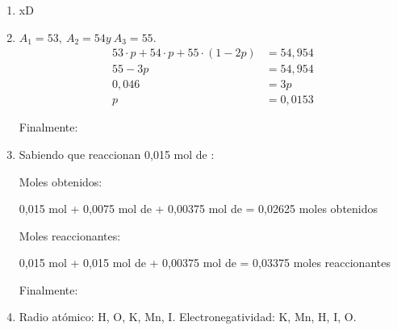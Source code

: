 \begin{enumerate}
\item xD


\item $A_1=53,\ A_2=54 y\ A_3=55.$
\begin{align*}
    53 \cdot p + 54 \cdot p + 55 \cdot (1 - 2p) &= 54,954\\    
    55 - 3p &= 54,954\\
    0,046 &= 3p\\
    p &= 0,0153
\end{align*}

Finalmente:

\hfil {}\hfil


\item Sabiendo que reaccionan 0,015 mol de :

Moles obtenidos:

\hfil
0,015 mol  + 0,0075 mol de  + 0,00375 mol de  = 0,02625 moles obtenidos
\hfil

Moles reaccionantes:

\hfil
0,015 mol  + 0,015 mol de  + 0,00375 mol de  = 0,03375 moles reaccionantes
\hfil


Finalmente:

\hfil {}\hfil


\item Radio atómico: H, O, K, Mn, I.
\hfil
Electronegatividad: K, Mn, H, I, O.
\hfil

\end{enumerate}

